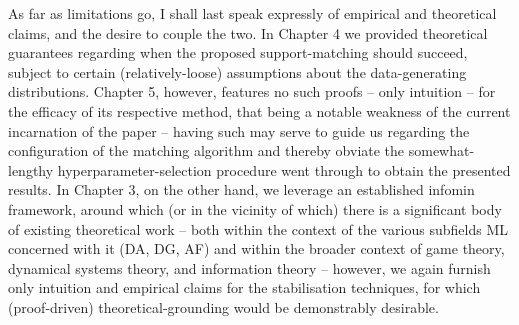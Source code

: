 %
%
As far as limitations go, I shall last speak expressly of empirical and theoretical claims, and the
desire to couple the two.
%
In Chapter 4 we provided theoretical guarantees regarding when the proposed support-matching should
succeed, subject to certain (relatively-loose) assumptions about the data-generating distributions.
%
Chapter 5, however, features no such proofs -- only intuition -- for the efficacy of its respective
method, that being a notable weakness of the current incarnation of the paper -- having such may
serve to guide us regarding the configuration of the matching algorithm and thereby obviate the
somewhat-lengthy hyperparameter-selection procedure went through to obtain the presented results.
%
In Chapter 3, on the other hand, we leverage an established infomin framework, around which (or in
the vicinity of which) there is a significant body of existing theoretical work -- both within the
context of the various subfields ML concerned with it (DA, DG, AF) and within the broader context
of game theory, dynamical systems theory, and information theory -- however, we again furnish only
intuition and empirical claims for the stabilisation techniques, for which (proof-driven)
theoretical-grounding would be demonstrably desirable.

%
